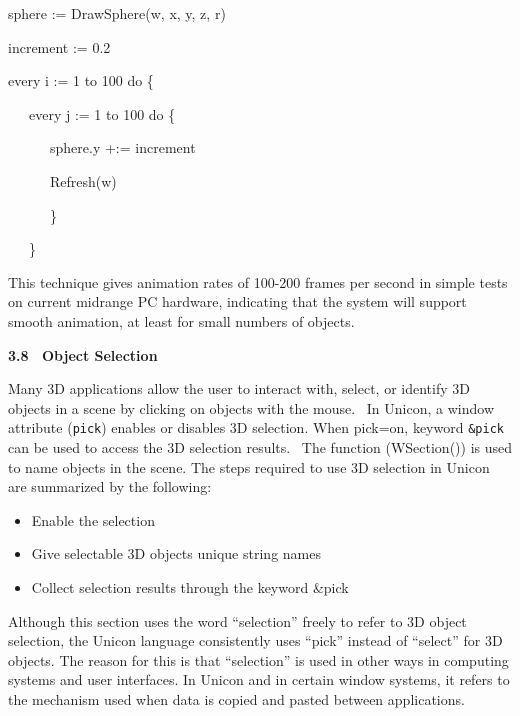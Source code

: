 \documentclass[letterpaper]{article}
\newcommand\liststyleWWviiiNumv{%
\renewcommand\theenumi{\arabic{enumi}}
\renewcommand\theenumii{\arabic{enumii}}
\renewcommand\theenumiii{\arabic{enumiii}}
\renewcommand\labelitemi{[F0B7?]}
\renewcommand\labelenumi{\theenumi.}
\renewcommand\labelenumii{\theenumii.}
\renewcommand\labelenumiii{\theenumiii.}
}
\begin{document}
\bigskip

{\sffamily
sphere := DrawSphere(w, x, y, z, r)}

{\sffamily
increment := 0.2}

{\sffamily
every i := 1 to 100 do \{}

{\sffamily
\ \ \ every j := 1 to 100 do \{}

{\sffamily
\ \ \ \ \ \ sphere.y +:= increment}

{\sffamily
\ \ \ \ \ \ Refresh(w)}

{\sffamily
\ \ \ \ \ \ \}}

{\sffamily
\ \ \ \}}

{
This technique gives animation rates of 100-200 frames per second in simple tests on current midrange PC hardware,
indicating that the system will support smooth animation, at least for small numbers of objects.}


\bigskip

{\bfseries
3.8 \ Object Selection}


\bigskip

{
Many 3D applications allow the user to interact with, select, or identify 3D objects in a scene by clicking on objects
with the mouse. \ In Unicon, a window attribute (\texttt{pick}) enables or disables 3D selection. When pick=on, keyword
\texttt{\&pick} can be used to access the 3D selection results. \ The function (WSection()) is used to name objects in
the scene. The steps required to use 3D selection in Unicon are summarized by the following:}


\bigskip

\liststyleWWviiiNumv
\begin{itemize}
\item {
Enable the selection}
\item {
Give selectable 3D objects unique string names}
\item {
Collect selection results through the keyword \textsf{\&pick}}
\end{itemize}

\bigskip

{
Although this section uses the word ``selection'' freely to refer to 3D object selection, the Unicon language
consistently uses ``pick'' instead of ``select'' for 3D objects. The reason for this is that ``selection'' is used in
other ways in computing systems and user interfaces. In Unicon and in certain window systems, it refers to the
mechanism used when data is copied and pasted between applications. }
\end{document}
